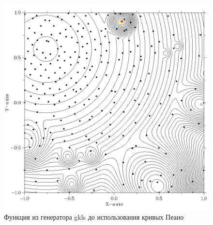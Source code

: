 \documentclass{svproc}
\begin{document}
\begin{figure}[ht!]
	\begin{center}
		\begin{minipage}[h]{0.6\linewidth}
			\includegraphics[width=1\linewidth]{figure/fig2.png}
			\caption{Функция из генератора gkls до использования кривых Пеано} %
			\label{fig:fig2}
		\end{minipage}
	\end{center}
\end{figure}	
\end{document}
